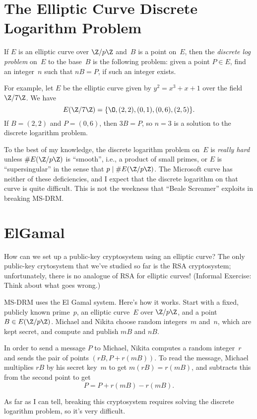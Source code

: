 \documentclass[11pt]{report}
\begin{document}
\section{The Elliptic Curve Discrete Logarithm Problem}
\begin{definition}
  If $E$ is an elliptic curve over $\Z/p\Z$ and~$B$ is a point on~$E$,
  then the {\em discrete log problem} on~$E$ to the base~$B$ is the
  following problem: given a point $P\in E$, find an integer~$n$
  such that $nB = P$, if such an integer exists.
\end{definition}

For example, let $E$ be the elliptic curve given by $y^2 = x^3 + x+1$
over the field $\Z/7\Z$.  We have
$$
  E(\Z/7\Z) = \{\O, (2, 2), (0,1), (0,6), (2,5) \}.
$$
If $B=(2,2)$ and $P=(0,6)$, then $3B=P$, so $n=3$
is a solution to the discrete logarithm problem.

To the best of my knowledge, the discrete logarithm problem on~$E$
is {\em really hard} unless $\#E(\Z/p\Z)$ is ``smooth'', i.e., a
product of small primes, or $E$ is ``supersingular'' in the sense
that $p\mid \#E(\Z/p\Z)$.
The Microsoft curve has neither of these deficiencies, and I
expect that the discrete logarithm on that curve is quite difficult.
This is not the weekness that ``Beale Screamer'' exploits in
breaking MS-DRM.

\section{ElGamal}
How can we set up a public-key cryptosystem using an elliptic curve?
The only public-key crytosystem that we've studied so far is the RSA
cryptosystem; unfortunately, there is no analogue of RSA for elliptic
curves!  (Informal Exercise: Think about what goes wrong.)

MS-DRM uses the El Gamal system.  Here's how it works.
Start with a fixed, publicly known prime~$p$, an elliptic
curve~$E$ over $\Z/p\Z$, and a point $B\in E(\Z/p\Z)$.
Michael and Nikita choose random integers~$m$ and~$n$, which
are kept secret, and compute and publish $mB$ and $nB$.

In order to send a message $P$ to Michael, Nikita
computes a random integer~$r$ and sends the pair of
points $(rB, P+r(mB))$.  To read the message,
Michael multiplies $rB$ by his secret key~$m$
to get $m(rB) = r(mB)$, and subtracts this from
the second point to get
$$P = P+r(mB)-r(mB).$$

As far as I can tell, breaking this cryptosystem requires solving the
discrete logarithm problem, so it's very difficult.
\end{document}
